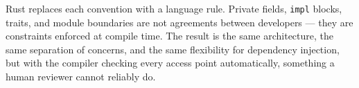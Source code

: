 Rust replaces each convention with a language rule. Private fields,
\texttt{impl} blocks, traits, and module boundaries are not agreements
between developers --- they are constraints enforced at compile time. The
result is the same architecture, the same separation of concerns, and the
same flexibility for dependency injection, but with the compiler checking every 
access point automatically, something a human reviewer cannot reliably do.